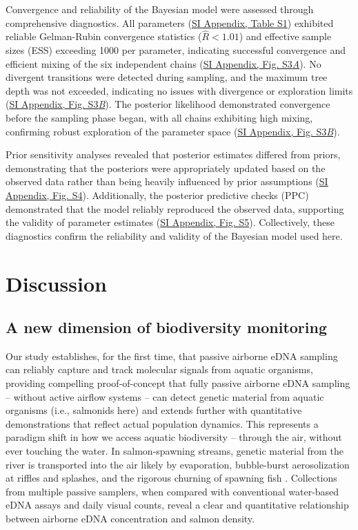 \documentclass{article}
\begin{document}
Convergence and reliability of the Bayesian model were assessed through comprehensive diagnostics. All parameters (\href{SI_Appendix.pdf}{SI Appendix, Table S1}) exhibited reliable Gelman-Rubin convergence statistics ($\hat{R} < 1.01$) and effective sample sizes (ESS) exceeding 1000 per parameter, indicating successful convergence and efficient mixing of the six independent chains (\href{SI_Appendix.pdf}{SI Appendix, Fig. S3\textit{A}}). No divergent transitions were detected during sampling, and the maximum tree depth was not exceeded, indicating no issues with divergence or exploration limits (\href{SI_Appendix.pdf}{SI Appendix, Fig. S3\textit{B}}). The posterior likelihood demonstrated convergence before the sampling phase began, with all chains exhibiting high mixing, confirming robust exploration of the parameter space (\href{SI_Appendix.pdf}{SI Appendix, Fig. S3\textit{B}}).

Prior sensitivity analyses revealed that posterior estimates differed from priors, demonstrating that the posteriors were appropriately updated based on the observed data rather than being heavily influenced by prior assumptions (\href{SI_Appendix.pdf}{SI Appendix, Fig. S4}). Additionally, the posterior predictive checks (PPC) demonstrated that the model reliably reproduced the observed data, supporting the validity of parameter estimates (\href{SI_Appendix.pdf}{SI Appendix, Fig. S5}).  Collectively, these diagnostics confirm the reliability and validity of the Bayesian model used here.


\section{Discussion}
\subsection{A new dimension of biodiversity monitoring}

Our study establishes, for the first time, that passive airborne eDNA sampling can reliably capture and track molecular signals from aquatic organisms, providing compelling proof-of-concept that fully passive airborne eDNA sampling -- without active airflow systems -- can detect genetic material from aquatic organisms (i.e., salmonids here) and extends further with quantitative demonstrations that reflect actual population dynamics. This represents a paradigm shift in how we access aquatic biodiversity -- through the air, without ever touching the water. In salmon-spawning streams, genetic material from the river is transported into the air likely by evaporation, bubble-burst aerosolization at riffles and splashes, and the rigorous churning of spawning fish \cite{wood2021, prather2013}. Collections from multiple passive samplers, when compared with conventional water-based eDNA assays and daily visual counts, reveal a clear and quantitative relationship between airborne eDNA concentration and salmon density. 
\end{document}
